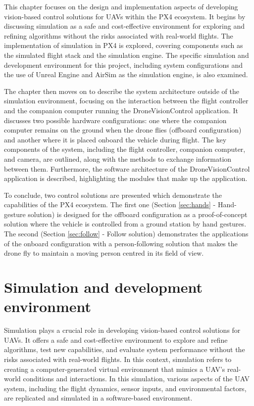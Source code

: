 This chapter focuses on the design and implementation aspects of developing vision-based control solutions for UAVs within the PX4 ecosystem. It begins by discussing simulation as a safe and cost-effective environment for exploring and refining algorithms without the risks associated with real-world flights. The implementation of simulation in PX4 is explored, covering components such as the simulated flight stack and the simulation engine. The specific simulation and development environment for this project, including system configurations and the use of Unreal Engine and AirSim as the simulation engine, is also examined.

The chapter then moves on to describe the system architecture outside of the simulation environment, focusing on the interaction between the flight controller and the companion computer running the DroneVisionControl application. It discusses two possible hardware configurations: one where the companion computer remains on the ground when the drone flies (offboard configuration) and another where it is placed onboard the vehicle during flight. The key components of the system, including the flight controller, companion computer, and camera, are outlined, along with the methods to exchange information between them. Furthermore, the software architecture of the DroneVisionControl application is described, highlighting the modules that make up the application.

To conclude, two control solutions are presented which demonstrate the capabilities of the PX4 ecosystem. The first one (Section \ref{sec:hands} - Hand-gesture solution) is designed for the offboard configuration as a proof-of-concept solution where the vehicle is controlled from a ground station by hand gestures. The second (Section \ref{sec:follow} - Follow solution) demonstrates the applications of the onboard configuration with a person-following solution that makes the drone fly to maintain a moving person centred in its field of view.

\section{Simulation and development environment}
\label{sec:devenv}
Simulation plays a crucial role in developing vision-based control solutions for UAVs. It offers a safe and cost-effective environment to explore and refine algorithms, test new capabilities, and evaluate system performance without the risks associated with real-world flights. 
In this context, simulation refers to creating a computer-generated virtual environment that mimics a UAV's real-world conditions and interactions. In this simulation, various aspects of the UAV system, including the flight dynamics, sensor inputs, and environmental factors, are replicated and simulated in a software-based environment.

